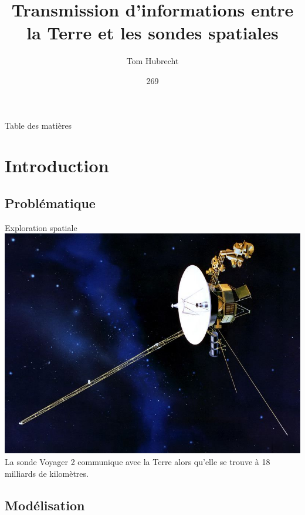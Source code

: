 \documentclass[11pt]{beamer}
\author{Tom Hubrecht}
\title{Transmission d'informations entre la Terre et les sondes spatiales}
\date{269}
\begin{document}
\begin{frame}[plain]
	\maketitle
\end{frame}

\begin{frame}[plain]{Table des mati\`eres}
	\tableofcontents
\end{frame}


\section{Introduction}
\subsection{Probl\'ematique}


\begin{frame}{Exploration spatiale}
	\centering
	\includegraphics[scale=0.4]{VoyagerReverse}\\
	La sonde Voyager 2 communique avec la Terre alors qu'elle se trouve \`a 18 milliards de kilom\`etres.
\end{frame}


\subsection{Mod\'elisation}
\end{document}
